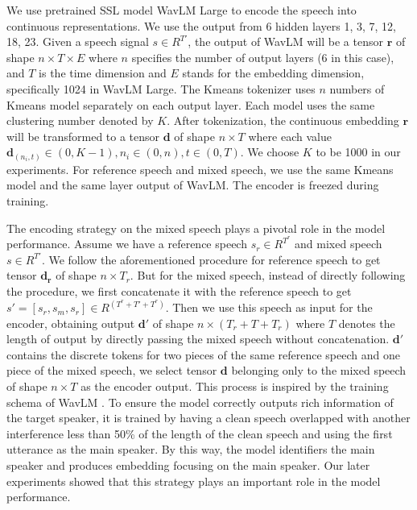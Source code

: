 \documentclass[conference]{IEEEtran}
\begin{document}
  

We use pretrained SSL model WavLM Large \cite{wavlm} to 
encode the speech into continuous representations. We use the output from 6 hidden 
layers 1, 3, 7, 12, 18, 23. Given a speech signal \(s \in R^{T'} \), the output 
of WavLM will be a tensor \(\bm{r}\) of shape \(n \times T \times E\) where 
\(n\) specifies the number 
of output layers (6 in this case), and  \(T\) is the time 
dimension and \(E\) stands for the 
embedding dimension, specifically 1024 in WavLM Large. The Kmeans tokenizer uses \(n\) numbers of  Kmeans model 
separately on each output layer. Each model uses the same clustering number denoted by \(K\).
After tokenization, the continuous embedding \(\bm{r}\) will be transformed to a tensor \(\bm{d}\) of shape \(n \times T\) where each value \(\bm{d}_{(n_i,t)} \in (0, K-1), n_i \in (0,n), t \in 
(0, T)\). We choose \(K\) to be 1000 in our experiments. For reference speech and mixed speech, we 
use the same Kmeans model and the same layer output of WavLM. The encoder is freezed during training.

The encoding strategy on the mixed speech plays a pivotal role in the model performance. Assume we 
have a reference speech \(s_r \in R^{T^r} \) and mixed speech \(s \in R^{T'}\). 
We follow the 
aforementioned procedure for 
reference speech to get tensor \(\bm{d_r}\) of shape \(n \times T_r\). But for the mixed 
speech, instead of directly following the procedure, we first concatenate it with 
the reference speech to get \(s' = [s_r, s_m, s_r] \in R^{(T^r+T'+T^r)}\). Then we use this speech 
as input for the encoder, obtaining output \(\bm{d'}\) of shape \(n \times (T_r+T+T_r)\) where \(T\) 
denotes the length of output by directly passing the mixed speech without concatenation. \(\bm{d'}\) 
contains the discrete tokens for two pieces of the same reference speech and one piece of the mixed 
speech, we select tensor \(\bm{d}\) belonging only to the mixed speech of shape \(n\times T\) as the 
encoder output. This process is inspired by the training schema of WavLM \cite{wavlm}. To ensure the 
model correctly outputs rich information of the target speaker, it is trained by 
having a clean speech overlapped with another interference less than 50\% of the length of the clean 
speech and using the first utterance as the main speaker. By this way, the model identifiers the 
main speaker and produces embedding focusing on the main speaker. Our later experiments showed that 
this strategy plays an important role in the model performance. 
\end{document}

